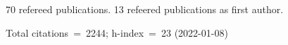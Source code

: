 70 refereed publications. 13 refeered publications as first author.

Total citations~=~2244; h-index~=~23 (2022-01-08)